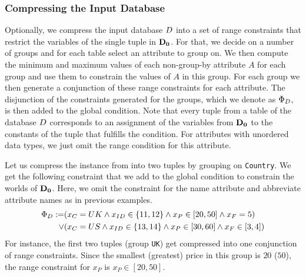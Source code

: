 \subsubsection{Compressing the Input Database}
\label{sec:compr-input-datab}

Optionally, we compress the input database $D$ into a set of range constraints that restrict the variables of the single tuple in $\mathbf{D_0}$. For that, we decide on a number of groups and for each table select an attribute to group on. We then compute the minimum and maximum values of each non-group-by attribute $A$ for each group and use them to constrain the values of $A$ in this group. For each group we then generate a conjunction of these range constraints for each attribute. The  disjunction of the constraints generated for the groups, which we denote as $\Phi_{D}$, is then added to the global condition. Note that every tuple from a table of the database $D$ corresponds to an assignment of the variables from $\mathbf{D_0}$ to the constants of the tuple that fulfills the condition. For attributes with unordered data types, we just omit the range condition for this attribute.

\begin{exam}\label{ex:compressing-databases}
Let us compress the instance from   into two tuples by grouping on \texttt{Country}. We get the following constraint that we add to the global condition to constrain the worlds of $\mathbf{D_0}$. Here, we omit the constraint for the name attribute and abbreviate attribute names as in previous examples.
%
  \begin{align*}
    \Phi_{D}  := &(x_{C} = UK \land x_{ID} \in \{11,12\} \land
    x_{P} \in [20,50] \land
    x_{F} = 5)\\
    \lor &(x_{C} = US \land x_{ID} \in \{13,14\}
           \land
          x_{P} \in [30,60] \land
          x_{F} \in [3,4])
  \end{align*}
For instance, the first two tuples (group \texttt{UK}) get compressed into one conjunction of range constraints. Since the smallest (greatest) price in this group is $20$ ($50$), the range constraint for $x_{P}$ is $x_{P}  \in [20,50]$.
\end{exam}

